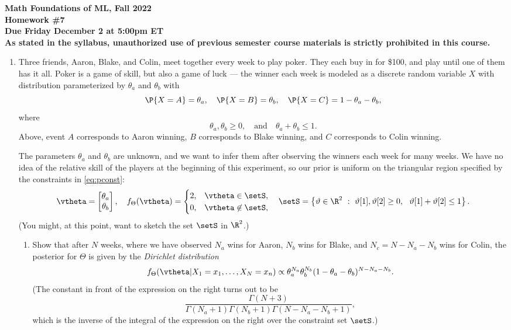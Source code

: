 \documentclass[11pt]{article}
\begin{document}

\noindent
{\bf\large Math Foundations of ML, Fall 2022} \\[3mm]
{\bf\large Homework \#7} \\[3mm]
{\bf Due Friday December 2 at 5:00pm ET}\\[3mm]

{\bf As stated in the syllabus, unauthorized use of previous semester course materials is strictly prohibited in this course.}

\begin{enumerate}

\item Three friends, Aaron, Blake, and Colin, meet together every week to play poker.  They each buy in for \$100, and play until one of them has it all.  Poker is a game of skill, but also a game of luck --- the winner each week is modeled as a discrete random variable $X$ with distribution parameterized by $\theta_a$ and $\theta_b$ with 
\[
	\P{X=A} = \theta_a,\quad \P{X=B} = \theta_b, \quad \P{X=C} = 1-\theta_a-\theta_b,
\]
where
\begin{equation}
	\label{eq:pconst}
	\theta_a,\theta_b\geq 0,\quad\text{and}\quad \theta_a+\theta_b\leq 1.
\end{equation}
Above, event $A$ corresponds to Aaron winning, $B$ corresponds to Blake winning, and $C$ corresponds to Colin winning.

The parameters $\theta_a$ and $\theta_b$ are unknown, and we want to infer them after observing the winners each week for many weeks.  We have no idea of the relative skill of the players at the beginning of this experiment, so our prior is uniform on the triangular region specified by the constraints in \eqref{eq:pconst}:
\[
	\vtheta = \begin{bmatrix} \theta_a \\ \theta_b \end{bmatrix},
	\quad
	f_\Theta(\vtheta) = \begin{cases} 2, & \vtheta\in\setS, \\ 0, & \vtheta\not\in\setS ,\end{cases} 
	\quad
	\setS = \left\{\vartheta\in\R^2~:~\vartheta[1],\vartheta[2]\geq 0,~~\vartheta[1]+\vartheta[2]\leq 1\right\}.
\]
(You might, at this point, want to sketch the set $\setS$ in $\R^2$.)

\begin{enumerate}
	\item Show that after $N$ weeks, where we have observed $N_a$ wins for Aaron, $N_b$ wins for Blake, and $N_c = N-N_a-N_b$ wins for Colin, the posterior for $\Theta$ is given by the {\em Dirichlet distribution}
	\[
		f_{\Theta}(\vtheta|X_1=x_1,\ldots,X_N=x_n) \propto \theta_a^{N_a}\theta_b^{N_b}(1-\theta_a-\theta_b)^{N-N_a-N_b}.
	\]
	(The constant in front of the expression on the right turns out to be
	\[
		\frac{\Gamma(N+3)}{\Gamma(N_a+1)\Gamma(N_b+1)\Gamma(N-N_a-N_b+1)},
	\]
	which is the inverse of the integral of the expression on the right over the constraint set $\setS$.)
	

\end{enumerate}
\end{enumerate}
\end{document}

